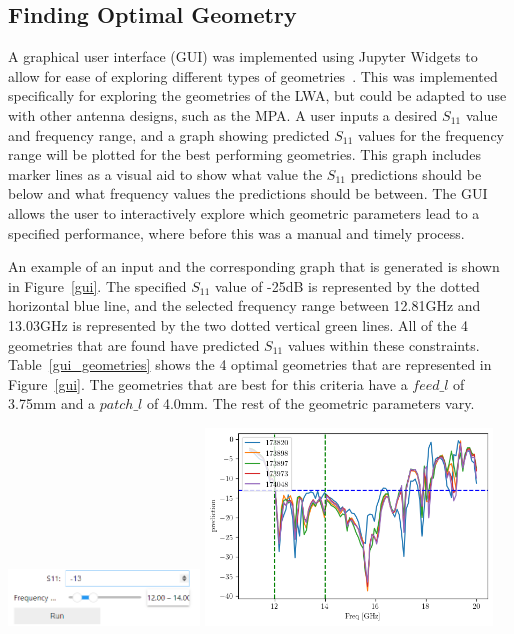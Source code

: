 \documentclass[conference]{IEEEtran}
\newenvironment{Figure}
    {\par\medskip\noindent\minipage{\linewidth}}
    {\endminipage\par\medskip}
\begin{document}
\subsection{Finding Optimal Geometry}
A graphical user interface (GUI) was implemented using Jupyter Widgets to allow for ease of exploring different types of geometries~\cite{interactive_Jupyter_widgets}. This was implemented specifically for exploring the geometries of the LWA, but could be adapted to use with other antenna designs, such as the MPA. A user inputs a desired $S_{11}$ value and frequency range, and a graph showing predicted $S_{11}$ values for the frequency range will be plotted for the best performing geometries. This graph includes marker lines as a visual aid to show what value the $S_{11}$ predictions should be below and what frequency values the predictions should be between. The GUI allows the user to interactively explore which geometric parameters lead to a specified performance, where before this was a manual and timely process.  


An example of an input and the corresponding graph that is generated is shown in Figure~\ref{gui}. The specified $S_{11}$ value of -25dB is represented by the dotted horizontal blue line, and the selected frequency range between 12.81GHz and 13.03GHz is represented by the two dotted vertical green lines. All of the 4 geometries that are found have predicted $S_{11}$ values within these constraints. Table~\ref{gui_geometries} shows the 4 optimal geometries that are represented in Figure~\ref{gui}. The geometries that are best for this criteria have a $feed\_l$ of 3.75mm and a $patch\_l$ of 4.0mm. The rest of the geometric parameters vary. 

\begin{Figure}
    \centering
    \includegraphics[width=2in]{gui_input}
    \includegraphics[width=3in]{gui_graph}
    \label{gui}
\end{Figure}
\end{document}
